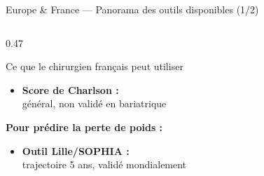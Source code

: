 \documentclass[aspectratio=169]{beamer}
\newcommand{\tightlist}{%
  \setlength{\itemsep}{1pt}\setlength{\parskip}{0pt}%
  \setlength{\parsep}{0pt}\setlength{\topsep}{2pt}}
\begin{document}
\begin{frame}{Europe \& France --- Panorama des outils disponibles (1/2)}
\begin{columns}[T]
\begin{column}{0.47\textwidth}
\begin{alertblock}{Ce que le chirurgien français peut utiliser}
\begin{itemize}
                général, non spécifique bariatrique
          \item \textbf{Score de Charlson :}\\
                général, non validé en bariatrique
        \end{itemize}
        \vspace{6pt}
        \textbf{Pour prédire la perte de poids :}
        \begin{itemize}\tightlist
          \item \textbf{Outil Lille/SOPHIA :}\\
                trajectoire 5 ans, validé mondialement
        \end{itemize}
      \end{alertblock}
    \end{column}
  \end{columns}
\end{frame}
\end{document}
